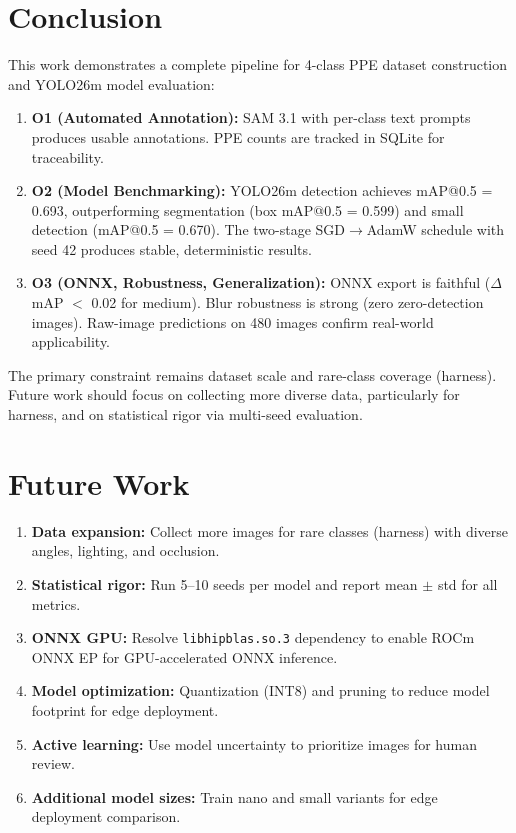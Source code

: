 \documentclass[a4paper,11pt]{article}
\begin{document}
\section{Conclusion}

This work demonstrates a complete pipeline for 4-class PPE dataset construction and YOLO26m model evaluation:

\begin{enumerate}[leftmargin=2cm, itemsep=2pt]
  \item \textbf{O1 (Automated Annotation):} SAM 3.1 with per-class text prompts produces usable annotations. PPE counts are tracked in SQLite for traceability.
  \item \textbf{O2 (Model Benchmarking):} YOLO26m detection achieves mAP@0.5 = 0.693, outperforming segmentation (box mAP@0.5 = 0.599) and small detection (mAP@0.5 = 0.670). The two-stage SGD$\rightarrow$AdamW schedule with seed 42 produces stable, deterministic results.
  \item \textbf{O3 (ONNX, Robustness, Generalization):} ONNX export is faithful ($\Delta$mAP $<$ 0.02 for medium). Blur robustness is strong (zero zero-detection images). Raw-image predictions on 480 images confirm real-world applicability.
\end{enumerate}

The primary constraint remains dataset scale and rare-class coverage (harness). Future work should focus on collecting more diverse data, particularly for harness, and on statistical rigor via multi-seed evaluation.

\section{Future Work}

\begin{enumerate}[leftmargin=2cm, itemsep=2pt]
  \item \textbf{Data expansion:} Collect more images for rare classes (harness) with diverse angles, lighting, and occlusion.
  \item \textbf{Statistical rigor:} Run 5--10 seeds per model and report mean $\pm$ std for all metrics.
  \item \textbf{ONNX GPU:} Resolve \texttt{libhipblas.so.3} dependency to enable ROCm ONNX EP for GPU-accelerated ONNX inference.
  \item \textbf{Model optimization:} Quantization (INT8) and pruning to reduce model footprint for edge deployment.
  \item \textbf{Active learning:} Use model uncertainty to prioritize images for human review.
  \item \textbf{Additional model sizes:} Train nano and small variants for edge deployment comparison.
\end{enumerate}
\end{document}
